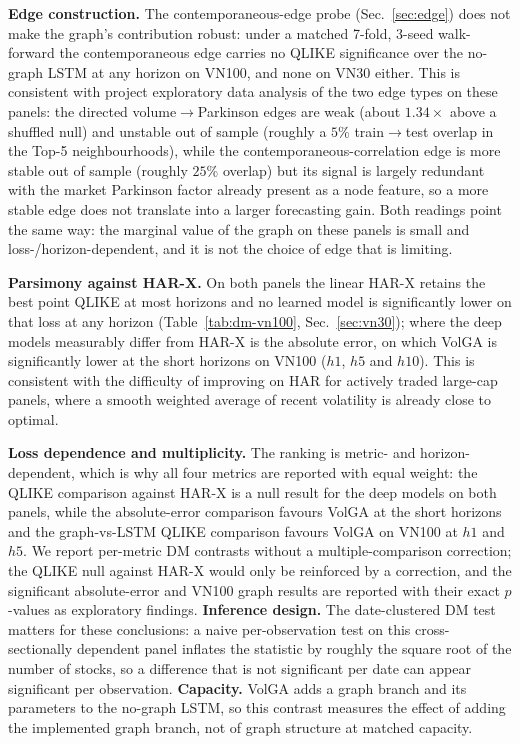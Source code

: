 \documentclass[runningheads]{llncs}
\begin{document}
\textbf{Edge construction.} The contemporaneous-edge probe (Sec.~\ref{sec:edge}) does not make the
graph's contribution robust: under a matched 7-fold, 3-seed walk-forward the contemporaneous edge
carries no QLIKE significance over the no-graph LSTM at any horizon on VN100, and none on VN30 either.
This is consistent with project exploratory data analysis of the two edge types on
these panels: the directed volume$\to$Parkinson edges are weak (about $1.34\times$ above a shuffled
null) and unstable out of sample (roughly a $5\%$ train$\to$test overlap in the Top-5 neighbourhoods),
while the contemporaneous-correlation edge is more stable out of sample (roughly $25\%$ overlap) but
its signal is largely redundant with the market Parkinson factor already present as a node feature, so
a more stable edge does not translate into a larger forecasting gain. Both readings point the same
way: the marginal value of the graph on these panels is small and loss-/horizon-dependent, and it is
not the choice of edge that is limiting.

\textbf{Parsimony against HAR-X.} On both panels the linear HAR-X retains the best point QLIKE at most
horizons and no learned model is significantly lower on that loss at any horizon
(Table~\ref{tab:dm-vn100}, Sec.~\ref{sec:vn30}); where the deep models measurably differ from HAR-X is
the absolute error, on which VolGA is significantly lower at the short horizons on VN100 ($h1$, $h5$
and $h10$). This is consistent with the difficulty of improving on HAR for actively traded large-cap
panels, where a smooth weighted average of recent volatility is already close to optimal.

\textbf{Loss dependence and multiplicity.} The ranking is metric- and horizon-dependent, which is why
all four metrics are reported with equal weight: the QLIKE comparison against HAR-X is a null result
for the deep models on both panels, while the absolute-error comparison favours VolGA at the short
horizons and the graph-vs-LSTM QLIKE comparison favours VolGA on VN100 at $h1$ and $h5$. We report
per-metric DM contrasts without a multiple-comparison correction; the QLIKE null against HAR-X would
only be reinforced by a correction, and the significant absolute-error and VN100 graph results are
reported with their exact $p$-values as exploratory findings. \textbf{Inference design.} The
date-clustered DM test matters for these conclusions: a naive per-observation test on this
cross-sectionally dependent panel inflates the statistic by roughly the square root of the number of
stocks, so a difference that is not significant per date can appear significant per observation.
\textbf{Capacity.} VolGA adds a graph branch and its parameters to the no-graph LSTM, so this contrast
measures the effect of adding the implemented graph branch, not of graph structure at matched capacity.
\end{document}
